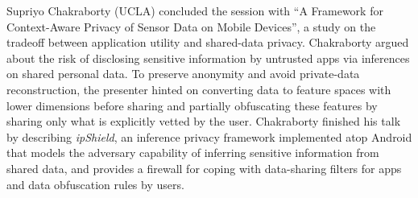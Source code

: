 Supriyo Chakraborty (UCLA) concluded the session with ``A
Framework for Context-Aware Privacy of Sensor Data on Mobile Devices'',
a study on the tradeoff between application utility and shared-data
privacy. Chakraborty argued about the risk of disclosing sensitive
information by untrusted apps via inferences on shared personal
data. To preserve anonymity and avoid private-data reconstruction, the
presenter hinted on converting data to feature spaces with lower
dimensions before sharing and partially obfuscating these features by
sharing only what is explicitly vetted by the user. Chakraborty finished
his talk by describing \emph{ipShield}, an inference privacy framework
implemented atop Android that models the adversary capability of
inferring sensitive information from shared data, and provides a
firewall for coping with data-sharing filters for apps and data
obfuscation rules by users.
